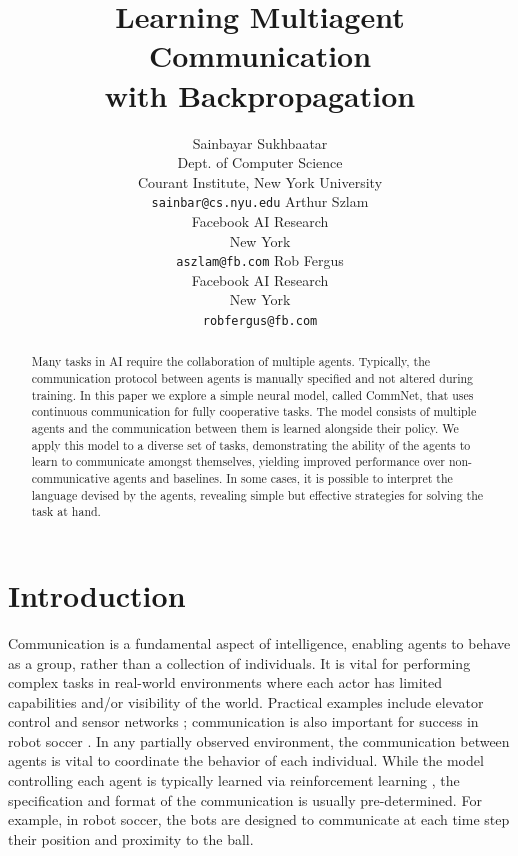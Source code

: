 \documentclass{article}
\title{Learning Multiagent Communication 
         \\with Backpropagation}
\author{
Sainbayar Sukhbaatar\\
Dept. of Computer Science\\
Courant Institute, New York University\\
\texttt{sainbar@cs.nyu.edu}
\And
Arthur Szlam\\
Facebook AI Research \\
New York\\
\texttt{aszlam@fb.com}
\And
Rob Fergus \\
Facebook AI Research \\
New York\\
\texttt{robfergus@fb.com}
}
\begin{document}
\maketitle
\vspace{-2mm}
\begin{abstract}
\vspace{-2mm}
  Many tasks in AI require the collaboration of multiple
  agents. Typically, the communication protocol between agents is
  manually specified and not altered during training. In this
  paper we explore a simple neural model, called CommNet, that uses continuous
  communication for fully cooperative tasks. The model consists of
  multiple agents and the communication between them is learned
  alongside their policy. We apply this model to a diverse set of
  tasks, demonstrating the ability of the agents to learn to
  communicate amongst themselves, yielding improved performance over
  non-communicative agents and baselines. In some cases, it is
  possible to interpret the language devised by the agents, revealing
  simple but effective strategies for solving the task at hand.
\end{abstract}

\vspace{-4mm} 
\section{Introduction}
\vspace{-2mm} 
Communication is a fundamental aspect of intelligence, enabling agents
to behave as a group, rather than a collection of individuals. It is
vital for performing complex tasks in real-world environments where
each actor has limited capabilities and/or visibility of the world. Practical examples
include  elevator
control \cite{Crites1998} and sensor networks \cite{Fox00}; communication is also important
for success in robot soccer \cite{Stone98}.
In any partially observed environment, the communication between
agents is vital to coordinate the behavior of each individual. While
the model controlling each agent is typically learned via
reinforcement learning \cite{busoniu2008comprehensive,Sutton98}, the
specification and format of the communication is usually
pre-determined. For example, in robot soccer, the bots are designed to
communicate at each time step their position and proximity to the
ball.
\end{document}
